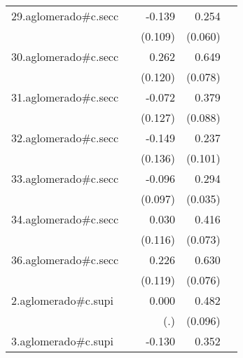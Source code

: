 {\begin{longtable}{l*{4}{D{.}{.}{-1}}}
\addlinespace
29.aglomerado#c.secc&                     &      -0.139         &       0.254\sym{***}&                     \\
            &                     &     (0.109)         &     (0.060)         &                     \\
\addlinespace
30.aglomerado#c.secc&                     &       0.262\sym{*}  &       0.649\sym{***}&                     \\
            &                     &     (0.120)         &     (0.078)         &                     \\
\addlinespace
31.aglomerado#c.secc&                     &      -0.072         &       0.379\sym{***}&                     \\
            &                     &     (0.127)         &     (0.088)         &                     \\
\addlinespace
32.aglomerado#c.secc&                     &      -0.149         &       0.237\sym{*}  &                     \\
            &                     &     (0.136)         &     (0.101)         &                     \\
\addlinespace
33.aglomerado#c.secc&                     &      -0.096         &       0.294\sym{***}&                     \\
            &                     &     (0.097)         &     (0.035)         &                     \\
\addlinespace
34.aglomerado#c.secc&                     &       0.030         &       0.416\sym{***}&                     \\
            &                     &     (0.116)         &     (0.073)         &                     \\
\addlinespace
36.aglomerado#c.secc&                     &       0.226         &       0.630\sym{***}&                     \\
            &                     &     (0.119)         &     (0.076)         &                     \\
\addlinespace
2.aglomerado#c.supi&                     &       0.000         &       0.482\sym{***}&                     \\
            &                     &         (.)         &     (0.096)         &                     \\
\addlinespace
3.aglomerado#c.supi&                     &      -0.130         &       0.352\sym{***}&                     \\

\end{longtable}}
